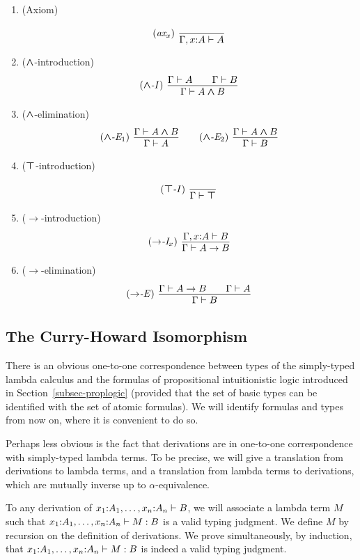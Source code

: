 \documentclass{article}
\begin{document}
\begin{enumerate}
\item (Axiom)
\[ \trule{ax$_x$}\ \deriv{}{\Gamma,\typ{x}{A}\tj A}
\]
\item ($\mathbin{\textrm{\rm\boldmath $\wedge$}}$-introduction)
\[ \trule{$\cand$-I}\ \deriv{\Gamma\tj A\sep\Gamma\tj B}{\Gamma\tj A\cand B}
\]
\item ($\mathbin{\textrm{\rm\boldmath $\wedge$}}$-elimination)
\[ \trule{$\cand$-E$_1$}\ \deriv{\Gamma\tj A\cand B}{\Gamma\tj A}
\sep
\trule{$\cand$-E$_2$}\ \deriv{\Gamma\tj A\cand B}{\Gamma\tj B}
\]
\item ($\textrm{\rm\boldmath $\top$}$-introduction)
\[ \trule{$\ctrue$-I}\ \deriv{}{\Gamma\tj\ctrue}
\]
\item ($\to$-introduction)
\[ \trule{$\to$-I$_x$}\ \deriv{\Gamma,\typ{x}{A}\tj B}{\Gamma\tj A\to B}
\]
\item ($\to$-elimination)
\[ \trule{$\to$-E}\ \deriv{\Gamma\tj A\to B\sep \Gamma\tj A}{\Gamma\tj B}
\]
\suspendenumerate
\end{enumerate}

\subsection{The Curry-Howard Isomorphism}

There is an obvious one-to-one correspondence between types of the
simply-typed lambda calculus and the formulas of propositional
intuitionistic logic introduced in Section~\ref{subsec-proplogic}
(provided that the set of basic types can be identified with the set
of atomic formulas). We will identify formulas and types from now on,
where it is convenient to do so.

Perhaps less obvious is the fact that derivations are in one-to-one
correspondence with simply-typed lambda terms. To be precise, we
will give a translation from derivations to lambda terms, and a
translation from lambda terms to derivations, which are mutually
inverse up to $\alpha$-equivalence. 

To any derivation of $x_1{:}A_1,\ldots,x_n{:}A_n\vdash B$, we
will associate a lambda term $M$ such that
$x_1{:}A_1,\ldots,x_n{:}A_n\vdash M:B$ is a valid typing
judgment. We define $M$ by recursion on the definition of derivations.
We prove simultaneously, by induction, that
$x_1{:}A_1,\ldots,x_n{:}A_n\vdash M:B$ is indeed a valid typing
judgment.
\end{document}
